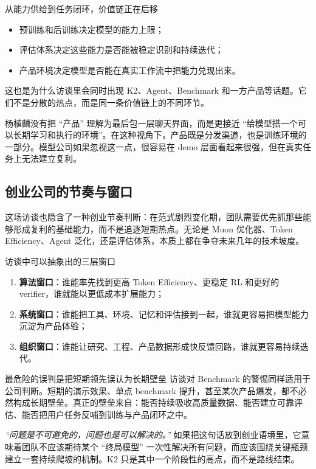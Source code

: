 \documentclass[a4paper]{article}
\begin{document}
\begin{importantbox}{从能力供给到任务闭环，价值链正在后移}
\begin{itemize}
    \item 预训练和后训练决定模型的能力上限；
    \item 评估体系决定这些能力是否能被稳定识别和持续迭代；
    \item 产品环境决定模型是否能在真实工作流中把能力兑现出来。
\end{itemize}
这也是为什么访谈里会同时出现 K2、Agent、Benchmark 和一方产品等话题。它们不是分散的热点，而是同一条价值链上的不同环节。
\end{importantbox}

杨植麟没有把 ``产品'' 理解为最后包一层聊天界面，而是更接近 ``给模型搭一个可以长期学习和执行的环境''。在这种视角下，产品既是分发渠道，也是训练环境的一部分。模型公司如果忽视这一点，很容易在 demo 层面看起来很强，但在真实任务上无法建立复利。

\subsection{创业公司的节奏与窗口}
这场访谈也隐含了一种创业节奏判断：在范式剧烈变化期，团队需要优先抓那些能够形成复利的基础能力，而不是追逐短期热点。无论是 Muon 优化器、Token Efficiency、Agent 泛化，还是评估体系，本质上都在争夺未来几年的技术坡度。

\begin{knowledgebox}{访谈中可以抽象出的三层窗口}
\begin{enumerate}
    \item \textbf{算法窗口}：谁能率先找到更高 Token Efficiency、更稳定 RL 和更好的 verifier，谁就能以更低成本扩展能力；
    \item \textbf{系统窗口}：谁能把工具、环境、记忆和评估接到一起，谁就更容易把模型能力沉淀为产品体验；
    \item \textbf{组织窗口}：谁能让研究、工程、产品数据形成快反馈回路，谁就更容易持续迭代。
\end{enumerate}
\end{knowledgebox}

\begin{warningbox}{最危险的误判是把短期领先误认为长期壁垒}
访谈对 Benchmark 的警惕同样适用于公司判断。短期的演示效果、单点 benchmark 提升，甚至某次产品爆发，都不必然构成长期壁垒。真正的壁垒来自：能否持续吸收高质量数据、能否建立可靠评估、能否把用户任务反哺到训练与产品闭环之中。
\end{warningbox}

\textit{``问题是不可避免的，问题也是可以解决的。''} 如果把这句话放到创业语境里，它意味着团队不应该期待某个 ``终局模型'' 一次性解决所有问题，而应该围绕关键瓶颈建立一套持续爬坡的机制。K2 只是其中一个阶段性的高点，而不是路线结束。
\end{document}
